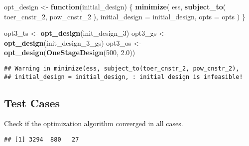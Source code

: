 \documentclass[]{book}
\newenvironment{Shaded}{\begin{snugshade}}{\end{snugshade}}
\newcommand{\ControlFlowTok}[1]{\textcolor[rgb]{0.13,0.29,0.53}{\textbf{#1}}}
\newcommand{\DataTypeTok}[1]{\textcolor[rgb]{0.13,0.29,0.53}{#1}}
\newcommand{\DecValTok}[1]{\textcolor[rgb]{0.00,0.00,0.81}{#1}}
\newcommand{\FloatTok}[1]{\textcolor[rgb]{0.00,0.00,0.81}{#1}}
\newcommand{\KeywordTok}[1]{\textcolor[rgb]{0.13,0.29,0.53}{\textbf{#1}}}
\newcommand{\NormalTok}[1]{#1}
\newcommand{\OperatorTok}[1]{\textcolor[rgb]{0.81,0.36,0.00}{\textbf{#1}}}
\newcommand{\StringTok}[1]{\textcolor[rgb]{0.31,0.60,0.02}{#1}}
\begin{document}
\begin{Shaded}
\begin{Highlighting}[]
\NormalTok{opt_design <-}\StringTok{ }\ControlFlowTok{function}\NormalTok{(initial_design) \{}
    \KeywordTok{minimize}\NormalTok{(}
\NormalTok{        ess,}
        \KeywordTok{subject_to}\NormalTok{(}
\NormalTok{            toer_cnstr_}\DecValTok{2}\NormalTok{,}
\NormalTok{            pow_cnstr_}\DecValTok{2}
\NormalTok{        ),}
        \DataTypeTok{initial_design =}\NormalTok{ initial_design,}
        \DataTypeTok{opts =}\NormalTok{ opts}
\NormalTok{    )}
\NormalTok{\}}

\NormalTok{opt3_ts <-}\StringTok{ }\KeywordTok{opt_design}\NormalTok{(init_design_}\DecValTok{3}\NormalTok{)}
\NormalTok{opt3_gs <-}\StringTok{ }\KeywordTok{opt_design}\NormalTok{(init_design_}\DecValTok{3}\NormalTok{_gs)}
\NormalTok{opt3_os <-}\StringTok{ }\KeywordTok{opt_design}\NormalTok{(}\KeywordTok{OneStageDesign}\NormalTok{(}\DecValTok{500}\NormalTok{, }\FloatTok{2.0}\NormalTok{))}
\end{Highlighting}
\end{Shaded}

\begin{verbatim}
## Warning in minimize(ess, subject_to(toer_cnstr_2, pow_cnstr_2),
## initial_design = initial_design, : initial design is infeasible!
\end{verbatim}

\hypertarget{test-cases-9}{%
\subsection{Test Cases}\label{test-cases-9}}

Check if the optimization algorithm converged in all cases.

\begin{Shaded}
\end{Shaded}

\begin{verbatim}
## [1] 3294  880   27
\end{verbatim}
\end{document}
